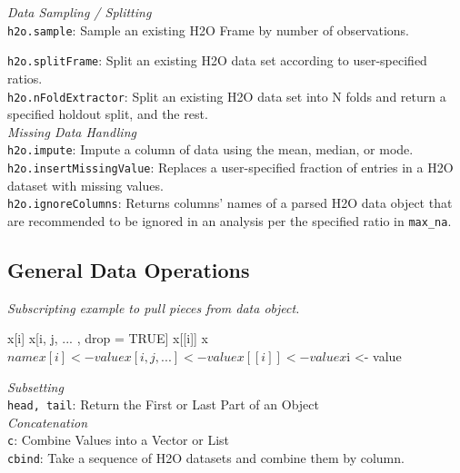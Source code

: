 \documentclass[11pt]{article}
\begin{document}
\emph{Data Sampling / Splitting}\\
 {\texttt{h2o.sample}}: Sample an existing H2O Frame by number of observations.\\
{\texttt{h2o.splitFrame}: Split an existing H2O data set according to user-specified ratios.\\
{\texttt{h2o.nFoldExtractor}}: Split an existing H2O data set into N folds and return a specified holdout split, and the rest.\\

\emph{Missing Data Handling}\\
{\texttt{h2o.impute}}: Impute a column of data using the mean, median, or mode.\\
{\texttt{h2o.insertMissingValue}}: Replaces a user-specified fraction of entries in a H2O dataset with missing values.\\
{\texttt{h2o.ignoreColumns}}: Returns columns' names of a parsed H2O data object that are recommended to be ignored in an analysis per the specified ratio in {\texttt{max\_na}}.\\

\subsection{General Data Operations}

\emph{Subscripting example to pull pieces from data object.} 
\begin{spverbatim}
  x[i]
  x[i, j, ... , drop = TRUE]
  x[[i]]
  x$name

  x[i] <- value
  x[i, j, ...] <- value
  x[[i]] <- value
  x$i <- value

\end{spverbatim}

\emph{Subsetting}\\
{\texttt{head, tail}}: Return the First or Last Part of an Object\\

\emph{Concatenation}
\\
 {\texttt{c}}: Combine Values into a Vector or List\\
 {\texttt{cbind}}: Take a sequence of H2O datasets and combine them by column.\\

}
\end{document}
